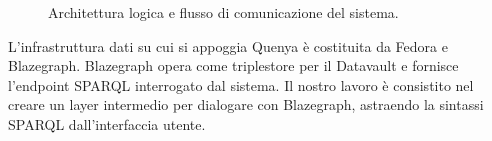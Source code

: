 \begin{figure}[htbp]
{
    }
    \caption{Architettura logica e flusso di comunicazione del sistema. 
    }\label{fig:arch_logica}
  \end{figure}

  L'infrastruttura dati su cui si appoggia Quenya è costituita da Fedora e Blazegraph. 
  Blazegraph opera come triplestore per il Datavault e fornisce l'endpoint SPARQL interrogato dal sistema.
  Il nostro lavoro è consistito nel creare un layer intermedio per dialogare con Blazegraph, astraendo la sintassi SPARQL dall'interfaccia utente.

